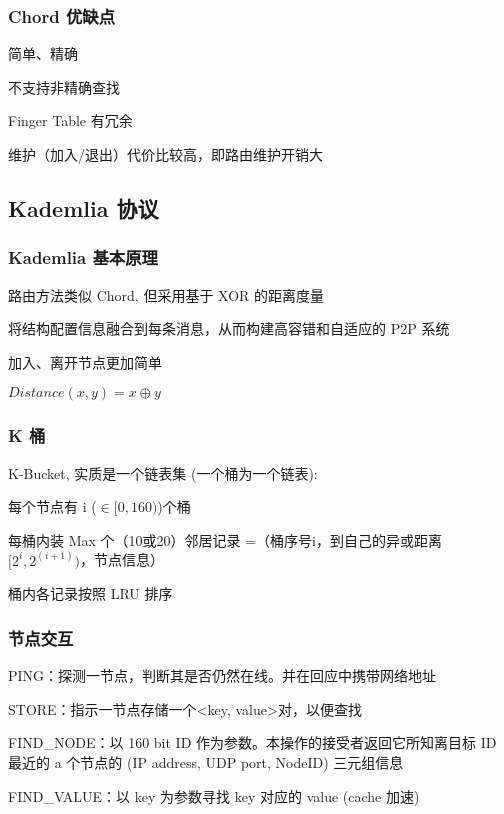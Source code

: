 \documentclass[UTF8,cs4size]{ctexart}
\begin{document}
\subsubsection{Chord 优缺点}
\begin{compactitem}
  \item 简单、精确
  \item 不支持非精确查找
  \item Finger Table 有冗余
  \item 维护（加入/退出）代价比较高，即路由维护开销大
\end{compactitem}
\subsection{Kademlia 协议}
\subsubsection{Kademlia 基本原理}
\begin{compactitem}
  \item 路由方法类似 Chord, 但采用基于 XOR 的距离度量
  \item 将结构配置信息融合到每条消息，从而构建高容错和自适应的 P2P 系统
  \item 加入、离开节点更加简单
  \item $Distance(x, y) = x \oplus y$
\end{compactitem}
\subsubsection{K 桶}
K-Bucket, 实质是一个链表集 (一个桶为一个链表):
\begin{compactitem}
  \item 每个节点有 i ($\in [0, 160)$)个桶
  \item 每桶内装 Max 个（10或20）邻居记录 =（桶序号i，到自己的异或距离$[2^i, 2^(i+1))$，节点信息）
  \item 桶内各记录按照 LRU 排序
\end{compactitem}
\subsubsection{节点交互}
\begin{compactitem}
  \item PING：探测一节点，判断其是否仍然在线。并在回应中携带网络地址
  \item STORE：指示一节点存储一个<key, value>对，以便查找
  \item FIND\_NODE：以 160 bit ID 作为参数。本操作的接受者返回它所知离目标 ID 最近的 a 个节点的 (IP address, UDP port, NodeID) 三元组信息
  \item FIND\_VALUE：以 key 为参数寻找 key 对应的 value (cache 加速)
\end{compactitem}
\end{document}
